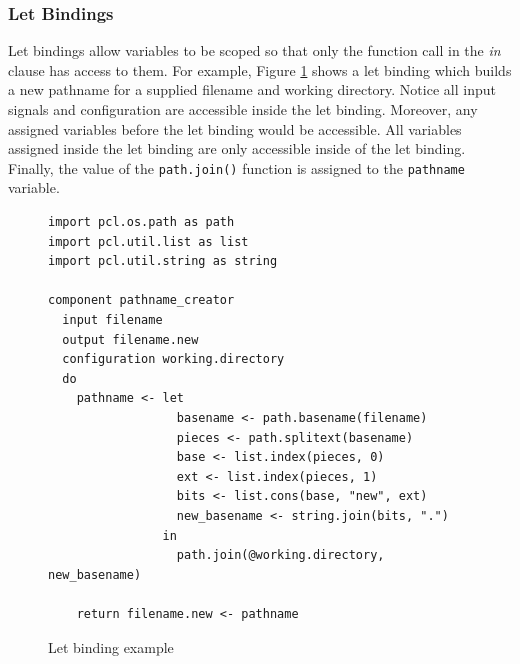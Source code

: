 \subsubsection{Let Bindings}
Let bindings allow variables to be scoped so that only the function call in the \emph{in} clause has access to them. For example, Figure \ref{fig:imperative-pcl-let-binding-example} shows a let binding which builds a new pathname for a supplied filename and working directory. Notice all input signals and configuration are accessible inside the let binding. Moreover, any assigned variables before the let binding would be accessible. All variables assigned inside the let binding are only accessible inside of the let binding. Finally, the value of the \texttt{path.join()} function is assigned to the \texttt{pathname} variable.
\begin{figure}[h!]
  \begin{verbatim}
import pcl.os.path as path
import pcl.util.list as list
import pcl.util.string as string

component pathname_creator
  input filename
  output filename.new
  configuration working.directory
  do
    pathname <- let
                  basename <- path.basename(filename)
                  pieces <- path.splitext(basename)
                  base <- list.index(pieces, 0)
                  ext <- list.index(pieces, 1)
                  bits <- list.cons(base, "new", ext)
                  new_basename <- string.join(bits, ".")
                in
                  path.join(@working.directory, new_basename)

    return filename.new <- pathname
  \end{verbatim}
  \caption{Let binding example}
  \label{fig:imperative-pcl-let-binding-example}
\end{figure}

\clearpage

